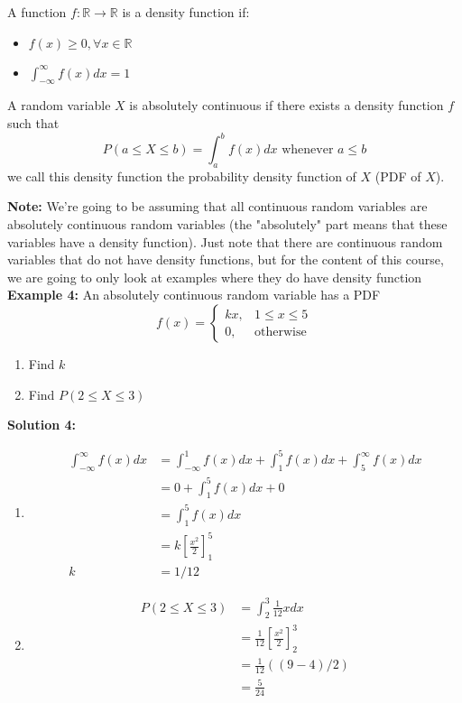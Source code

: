 \documentclass[12pt, twoside]{article}
\begin{document}
\begin{tcolorbox}[title=Definition: Density Function]
	A function $f:\mathbb{R} \longrightarrow \mathbb{R}$ is a density function if:
	\begin{itemize}
		\item{$f(x) \geq 0, \forall x \in\mathbb{R}$}
		\item{$\int_{-\infty}^{\infty} f(x) dx = 1$}
	\end{itemize}
\end{tcolorbox}

\begin{tcolorbox}[title=Definition: Absolutely Continuous Random Variables]
	A random variable $X$ is absolutely continuous if there exists a density function $f$ such that $$P(a \leq X \leq b ) = \int_{a}^{b} f(x) dx \text{ whenever } a \leq b$$
	we call this density function the probability density function of $X$ (PDF of $X$).
\end{tcolorbox}

\textbf{Note:} We're going to be assuming that all continuous random variables are absolutely continuous random variables (the "absolutely" part means that these variables have a density function). Just note that there are continuous random variables that do not have density functions, but for the content of this course, we are going to only look at examples where they do have density function
\\

\textbf{Example 4:} An absolutely continuous random variable has a PDF $$f(x) = \begin{cases}
	kx, & 1 \leq x \leq 5\\
	0, & \text{otherwise}
\end{cases}
$$
\begin{enumerate}
	\item{Find $k$}
	\item{Find $P(2 \leq X \leq 3)$}
\end{enumerate}

\textbf{Solution 4:}
\begin{enumerate}
	\item{
	\begin{align*}
		\int_{-\infty}^{\infty} f(x) dx &= \int_{-\infty}^{1} f(x) dx + \int_{1}^{5} f(x) dx + \int_{5}^{\infty} f(x) dx\\
		&= 0 + \int_{1}^{5} f(x) dx + 0\\
		&= \int_{1}^{5} f(x) dx\\
		&= k[\frac{x^2}{2}]^{5}_{1}\\
		k &= 1/12
	\end{align*}
	}
	\item{
	\begin{align*}
		P(2 \leq X \leq 3) &= \int_{2}^{3} \frac{1}{12}x dx\\
		&= \frac{1}{12}[\frac{x^2}{2}]^{3}_{2}\\
		&= \frac{1}{12}((9-4)/2)\\
		&= \frac{5}{24}
	\end{align*}
	}
\end{enumerate}
\end{document}

